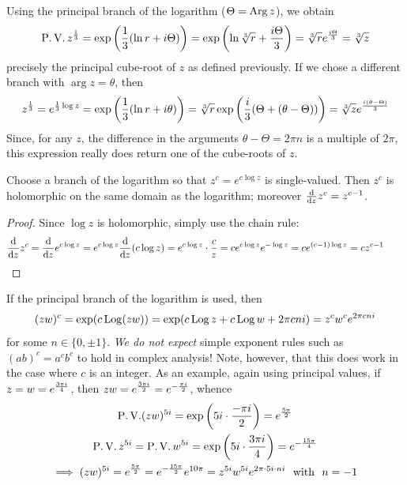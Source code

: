 \begin{example}{}{}
	Using the principal branch of the logarithm ($\Theta=\operatorname{Arg} z$), we obtain
	\[
		\operatorname{P.V.}z^{\frac 13}=\exp\left(\frac 13(\ln r+i\Theta)\right) =\exp\left(\ln \sqrt[3]{r}+\frac{i\Theta}3\right)=\sqrt[3]{r}e^{\frac{i\Theta}{3}} =\sqrt[3]{z}
	\]
	precisely the principal cube-root of $z$ as defined previously.\smallbreak
	If we chose a different branch with $\arg z=\theta$, then
	\[
		z^{\frac 13} =e^{\frac 13\log z}=\exp\left(\frac 13(\ln r+i\theta)\right) =\sqrt[3]{r}\exp\left(\frac i3(\Theta+(\theta-\Theta))\right) =\sqrt[3]{z}e^{\frac{i(\theta-\Theta)}{3}}
	\]
	Since, for any $z$, the difference in the arguments $\theta-\Theta=2\pi n$ is a multiple of $2\pi$, this expression really does return one of the cube-roots of $z$.
\end{example}

\begin{lemm}{}{}
	Choose a branch of the logarithm so that $z^c=e^{c\log z}$ is single-valued. Then $z^c$ is holomorphic on the same domain as the logarithm; moreover $\frac{\mathrm{d} }{\mathrm{d} z}z^c=z^{c-1}$.
\end{lemm}

\begin{proof}
	Since $\log z$ is holomorphic, simply use the chain rule:
	\[
		\frac{\mathrm{d} }{\mathrm{d} z}z^c=\frac{\mathrm{d} }{\mathrm{d} z}e^{c\log z}=e^{c\log z}\frac{\mathrm{d} }{\mathrm{d} z}(c\log z)=e^{c\log z}\cdot\frac cz =ce^{c\log z}e^{-\log z}=ce^{(c-1)\log z}=cz^{c-1}\tag*{\qedhere}
	\]
\end{proof}

\begin{example}{}{}
	If the principal branch of the logarithm is used, then
  \[
  	(zw)^c=\exp(c\operatorname{Log}(zw))=\exp(c\operatorname{Log} z+c\operatorname{Log} w+2\pi cn i)=z^cw^ce^{2\pi cn i}
  \]
  for some $n\in\{0,\pm 1\}$. \emph{We do not expect} simple exponent rules such as $(ab)^c=a^cb^c$ to hold in complex analysis! Note, however, that this does work in the case where $c$ is an integer.\smallbreak
  As an example, again using principal values, if $z=w=e^{\frac{3\pi i}{4}}$, then $zw=e^{\frac{3\pi i}{2}}=e^{-\frac{\pi i}{2}}$, whence
  \begin{gather*}
  	\operatorname{P.V.}(zw)^{5i}=\exp\left(5i\cdot \frac{-\pi i}2\right) =e^{\frac{5\pi}{2}}\\
  	\operatorname{P.V.}z^{5i}=\operatorname{P.V.}w^{5i}=\exp\left(5i\cdot \frac{3\pi i}4\right) =e^{-\frac{15\pi}{4}}\\
  	\implies (zw)^{5i} =e^{\frac{5\pi}{2}} = e^{-\frac{15\pi}{2}}e^{10\pi} =z^{5i}w^{5i} e^{2\pi\cdot 5i\cdot ni}\ \text{ with } \ n=-1
  \end{gather*}
\end{example}



